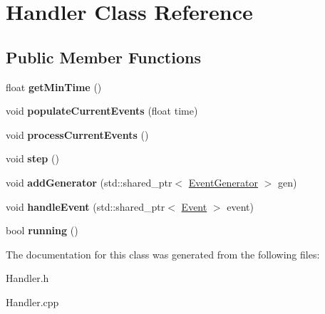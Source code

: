 \hypertarget{classHandler}{\section{\-Handler \-Class \-Reference}
\label{classHandler}
}
\subsection*{\-Public \-Member \-Functions}
\begin{DoxyCompactItemize}
\item 
\hypertarget{classHandler_aeb01be730be52d6ef994656d40a006ee}{float {\bfseries get\-Min\-Time} ()}\label{classHandler_aeb01be730be52d6ef994656d40a006ee}

\item 
\hypertarget{classHandler_ad81950f9fe02ec3c50f65ee3eb251738}{void {\bfseries populate\-Current\-Events} (float time)}\label{classHandler_ad81950f9fe02ec3c50f65ee3eb251738}

\item 
\hypertarget{classHandler_ad67c5bf3357aba8c6b71fa76c5161d29}{void {\bfseries process\-Current\-Events} ()}\label{classHandler_ad67c5bf3357aba8c6b71fa76c5161d29}

\item 
\hypertarget{classHandler_aa60626b419730f48a1bd5b91c9ade9d7}{void {\bfseries step} ()}\label{classHandler_aa60626b419730f48a1bd5b91c9ade9d7}

\item 
\hypertarget{classHandler_a6d66a0dfe17658e9ba92080d506654ac}{void {\bfseries add\-Generator} (std\-::shared\-\_\-ptr$<$ \hyperlink{classEventGenerator}{\-Event\-Generator} $>$ gen)}\label{classHandler_a6d66a0dfe17658e9ba92080d506654ac}

\item 
\hypertarget{classHandler_a1f9bd53a9251f712c6ff20ca48122e6f}{void {\bfseries handle\-Event} (std\-::shared\-\_\-ptr$<$ \hyperlink{classEvent}{\-Event} $>$ event)}\label{classHandler_a1f9bd53a9251f712c6ff20ca48122e6f}

\item 
\hypertarget{classHandler_a4639718d2f590ebd22d0d949a239327d}{bool {\bfseries running} ()}\label{classHandler_a4639718d2f590ebd22d0d949a239327d}

\end{DoxyCompactItemize}


\-The documentation for this class was generated from the following files\-:\begin{DoxyCompactItemize}
\item 
\-Handler.\-h\item 
\-Handler.\-cpp\end{DoxyCompactItemize}
